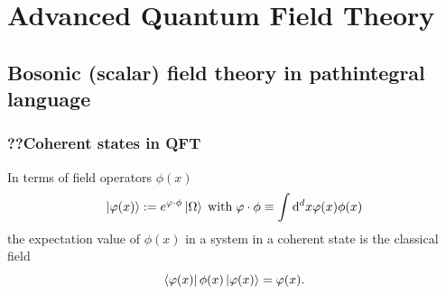 
\chapter{Advanced Quantum Field Theory}
\section{Bosonic (scalar) field theory in pathintegral language}
\subsection{??Coherent states in QFT}
\begin{mybox}{}
	In terms of field operators $\phi(x)$
	\begin{equation}
		\ket{\varphi(x)}:= e^{\varphi\cdot \phi} \ket{\Omega} \; \text{with} \; \varphi\cdot\phi\equiv\int\mathrm{d}^d x \varphi(x) \phi(x)
	\end{equation}
	the expectation value of $\phi(x)$ in a system in a coherent state is the classical field
	\begin{equation}
	\bra{\varphi(x)}\phi(x) \ket{\varphi(x)} = \varphi(x).
	\end{equation}
\end{mybox}
















